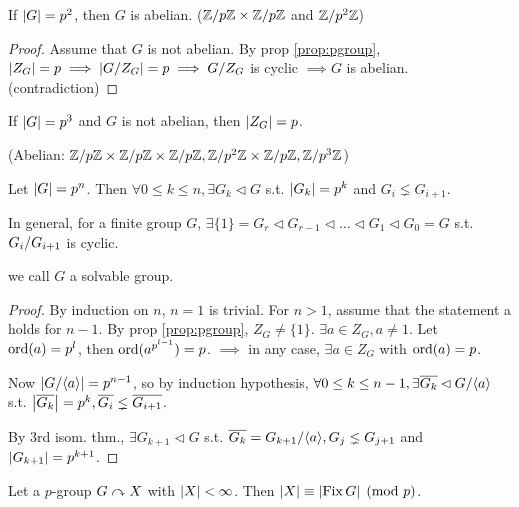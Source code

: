 \begin{prop}
  If $\abs{G} = p^2$, then $G$ is abelian.
  ($\quot{\Zb}{p\Zb} \times \quot{\Zb}{p\Zb}$ and $\quot{\Zb}{p^2\Zb}$)
  \begin{proof}
    Assume that $G$ is not abelian.
    By prop \ref{prop:pgroup}, $\abs{Z_G} = p \implies \abs{\quot{G}{Z_G}} = p
    \implies \quot{G}{Z_G}$ is cyclic $\implies G$ is abelian. (contradiction)
  \end{proof}
\end{prop}

\begin{prop}
  If $\abs{G} = p^3$ and $G$ is not abelian, then $\abs{Z_G} = p$.

  (Abelian: $\quot{\Zb}{p\Zb} \times \quot{\Zb}{p\Zb} \times \quot{\Zb}{p\Zb},
  \quot{\Zb}{p^2\Zb} \times \quot{\Zb}{p\Zb}, \quot{\Zb}{p^3\Zb}$)

  \label{prop:w6p3}
\end{prop}

\begin{prop}
  Let $\abs{G} = p^n$. Then $\forall 0 \le k \le n, \exists G_k \lhd G$ s.t.
  $\abs{G_k} = p^k$ and $G_i \lneq G_{i+1}$.

  In general, for a finite group $G$, $\exists {\{1\}} =
  G_r \lhd G_{r-1} \lhd \dots \lhd G_1 \lhd G_0 = G$ s.t. $\quot{G_i}{G_{i+1}}$
  is cyclic.

  we call $G$ a solvable group.

  \begin{proof}
    By induction on $n$, $n = 1$ is trivial.
    For $n > 1$, assume that the statement a holds for $n-1$.
    By prop \ref{prop:pgroup}, $Z_G \ne \{1\}$. $\exists a \in Z_G, a \ne 1$.
    Let $\ord(a) = p^l$, then $\ord(a^{p^{l-1}}) = p$.
    $\implies$ in any case, $\exists a \in Z_G$ with $\ord(a) = p$.

    Now $\abs*{\quot{G}{\gen{a}}} = p^{n-1}$, so by induction hypothesis,
    $\forall 0 \le k \le n - 1, \exists \ob{G_k} \lhd \quot{G}{\gen{a}}$ s.t.
    $\abs*{\ob{G_k}} = p^k, \ob{G_i} \lneq \ob{G_{i+1}}$.

    By 3rd isom. thm., $\exists G_{k+1} \lhd G$ s.t. $\ob{G_k} =
    \quot{G_{k+1}}{\gen{a}}, G_j \lneq G_{j+1}$ and $\abs{G_{k+1}} = p^{k+1}$.

  \end{proof}
\end{prop}

\begin{prop}
  Let a $p$-group $G \acts X$ with $\abs{X} < \infty$.
  Then $\abs{X} \equiv \abs{\Fix G} \pmod p$.
  \label{prop:useful}
\end{prop}

